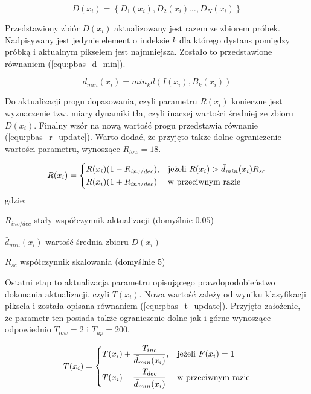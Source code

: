 	\begin{equation}
		D(x_i)= \left\{ D_1(x_i), D_2(x_i) \dotsc, D_N(x_i) \right\}
	\label{equ:pbas_model_2}	
	\end{equation}

Przedstawiony zbiór $D(x_i)$ aktualizowany jest razem ze zbiorem próbek. 
Nadpisywany jest jedynie element o indeksie $k$ dla którego dystans pomiędzy próbką i aktualnym pikselem jest najmniejsza. 
Zostało to przedstawione równaniem (\ref{equ:pbas_d_min}).
	
	\begin{equation}
		d_{min}(x_i) = min_k d(I(x_i), B_k(x_i))
	\label{equ:pbas_d_min}	
	\end{equation}

Do aktualizacji progu dopasowania, czyli parametru $R(x_i)$ konieczne jest wyznaczenie tzw. miary dynamiki tła, czyli inaczej wartości średniej ze zbioru $D(x_i)$. 
Finalny wzór na nową wartość progu przedstawia równanie (\ref{equ:pbas_r_update}). 
Warto dodać, że przyjęto także dolne ograniczenie wartości parametru, wynoszące $R_{low} = 18$.
    
    \begin{equation}
	    R(x_i) = 
		\begin{dcases}
    		R(x_i)(1-R_{inc/dec}), & \text{jeżeli } R(x_i) > \bar{d}_{min}(x_i)R_{sc} \\
    		R(x_i)(1+R_{inc/dec}) & \text{w przeciwnym razie} 
		\end{dcases}
	\label{equ:pbas_r_update}	
	\end{equation}
gdzie:
\begin{eqwhere}[2.2cm]
	\item[$R_{inc/dec}$] stały współczynnik aktualizacji (domyślnie $0.05$)
	\item[$\bar{d}_{min}(x_i)$] wartość średnia zbioru $D(x_i)$
	\item[$R_{sc}$] współczynnik skalowania (domyślnie $5$)
\end{eqwhere}

Ostatni etap to aktualizacja parametru opisującego prawdopodobieństwo dokonania aktualizacji, czyli $T(x_i)$. 
Nowa wartość zależy od wyniku klasyfikacji piksela i została opisana równaniem (\ref{equ:pbas_t_update}). 
Przyjęto założenie, że parametr ten posiada także ograniczenie dolne jak i górne wynoszące odpowiednio $T_{low}=2$ i $T_{up}=200$.  

    \begin{equation}
	    T(x_i) = 
		\begin{dcases}
    		T(x_i) + \frac{T_{inc}}{\bar{d}_{min}(x_i)}, & \text{jeżeli } F(x_i)=1 \\
    		T(x_i) - \frac{T_{dec}}{\bar{d}_{min}(x_i)} & \text{w przeciwnym razie} 
		\end{dcases}
	\label{equ:pbas_t_update}	
	\end{equation}



